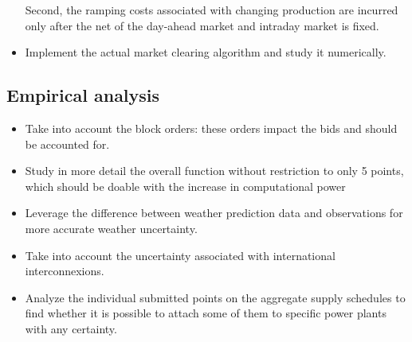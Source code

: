 \begin{itemize}
Second, the ramping costs associated with changing production are incurred only after the net of the day-ahead market and intraday market is fixed. 

\item Implement the actual market clearing algorithm and study it numerically.
\end{itemize}

\subsection*{Empirical analysis}

\begin{itemize}
\item Take into account the block orders: these orders impact the bids and should be accounted for.

\item Study in more detail the overall function without restriction to only 5 points, which should be doable with the increase in computational power

\item Leverage the difference between weather prediction data and observations for more accurate weather uncertainty.

\item Take into account the uncertainty associated with international interconnexions. 

\item Analyze the individual submitted points on the aggregate supply schedules to find whether it is possible to attach some of them to specific power plants with any certainty.
\end{itemize}



 